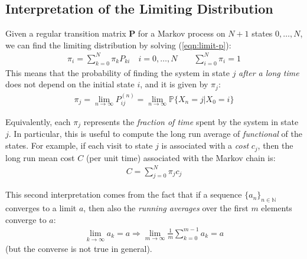 \documentclass[../template.tex]{subfiles}
\begin{document}

\subsection{Interpretation of the Limiting Distribution}
Given a regular transition matrix \textbf{P} for a Markov process on $N+1$ states $0,\dots, N$, we can find the limiting distribution by solving (\ref{eqn:limit-p}):
\begin{align*}
    \pi_i = \sum_{k=0}^N \pi_k P_{ki} \quad i=0,\dots,N \qquad \sum_{i=0}^N \pi_i = 1
\end{align*} 
This means that the probability of finding the system in state $j$ \textit{after a long time} does not depend on the initial state $i$, and it is given by $\pi_j$:
\begin{align*}
    \pi_j = \lim_{n \to \infty} P_{ij}^{(n)} = \lim_{n \to \infty} \mathbb{P}\{X_n = j | X_0 = i\}
\end{align*} 

Equivalently, each $\pi_j$ represents the \textit{fraction of time} spent by the system in state $j$. In particular, this is useful to compute the long run average of \textit{functional} of the states. For example, if each visit to state $j$ is associated with a \textit{cost} $c_j$, then the long run mean cost $C$ (per unit time) associated with the Markov chain is:
\begin{align*}
    C = \sum_{j = 0}^N \pi_j c_j
\end{align*}

This second interpretation comes from the fact that if a sequence $\{a_n\}_{n\in \mathbb{N}}$ converges to a limit $a$, then also the \textit{running averages} over the first $m$ elements converge to $a$:
\begin{align*}
    \lim_{k \to \infty} a_k = a \Rightarrow 
    \lim_{m \to \infty} \frac{1}{m} \sum_{k=0}^{m-1} a_k = a 
\end{align*}
(but the converse is not true in general). 
\end{document}
